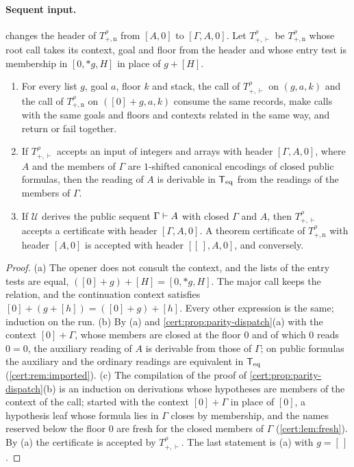 \paragraph{Sequent input.}  changes the header of
$T^{\rho}_{+,\mathrm n}$ from $[A,0]$ to $[\Gamma,A,0]$. Let $T^{\rho}_{+,\vdash}$ be
$T^{\rho}_{+,\mathrm n}$ whose root call takes its context, goal and floor from the header
and whose entry test is membership in $[0,{*}g,H]$ in place of $g+[H]$.

\begin{proposition}\label{cert:prop:sequent}
\begin{enumerate}[label=(\alph*)]
\item For every list $g$, goal $a$, floor $k$ and stack, the call of $T^{\rho}_{+,\vdash}$
on $(g,a,k)$ and the call of $T^{\rho}_{+,\mathrm n}$ on $([0]+g,a,k)$ consume the same
records, make calls with the same goals and floors and contexts related in the same way,
and return or fail together.
\item If $T^{\rho}_{+,\vdash}$ accepts an input of integers and arrays with header
$[\Gamma,A,0]$, where $A$ and the members of $\Gamma$ are $1$-shifted canonical encodings
of closed public formulas, then the reading of $A$ is derivable in $\mathsf{T}_{\mathrm{eq}}$ from the readings
of the members of $\Gamma$.
\item If $\mathcal U$ derives the public sequent $\Gamma\vdash A$ with closed $\Gamma$ and
$A$, then $T^{\rho}_{+,\vdash}$ accepts a certificate with header $[\Gamma,A,0]$. A theorem
certificate of $T^{\rho}_{+,\mathrm n}$ with header $[A,0]$ is accepted with header
$[[\,],A,0]$, and conversely.
\end{enumerate}
\end{proposition}
\begin{proof}
(a) The opener does not consult the context, and the lists of the entry tests are equal,
$([0]+g)+[H]=[0,{*}g,H]$. The major call keeps the relation, and the continuation context
satisfies $[0]+(g+[h])=([0]+g)+[h]$. Every other expression is the same; induction on the
run. (b) By (a) and \cref{cert:prop:parity-dispatch}(a) with the context $[0]+\Gamma$, whose
members are closed at the floor $0$ and of which $0$ reads $0=0$, the auxiliary reading of
$A$ is derivable from those of $\Gamma$; on public formulas the auxiliary and the ordinary
readings are equivalent in $\mathsf{T}_{\mathrm{eq}}$ (\cref{cert:rem:imported}). (c) The compilation of the
proof of \cref{cert:prop:parity-dispatch}(b) is an induction on derivations whose
hypotheses are members of the context of the call; started with the context
$[0]+\Gamma$ in place of $[0]$, a hypothesis leaf whose formula lies in $\Gamma$ closes by
membership, and the names reserved below the floor $0$ are fresh for the closed members of
$\Gamma$ (\cref{cert:lem:fresh}). By (a) the certificate is accepted by
$T^{\rho}_{+,\vdash}$. The last statement is (a) with $g=[\,]$.
\end{proof}

